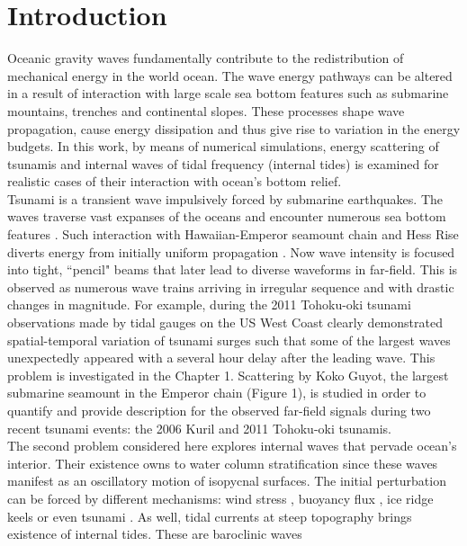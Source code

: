 \documentclass[12pt]{article}
\begin{document}
\newpage
\section{Introduction}
Oceanic gravity waves fundamentally contribute to the redistribution of mechanical energy in the 
world ocean. The wave energy pathways can be altered in a result of interaction with large scale 
sea bottom features such as submarine mountains, trenches and continental slopes. These processes 
shape wave propagation, cause energy dissipation and thus give rise to variation in 
the energy budgets. In this work, by means of numerical simulations, energy scattering of tsunamis 
and internal waves of tidal frequency (internal tides) is examined for realistic cases of their 
interaction with ocean's bottom relief.\\
Tsunami is a transient wave impulsively forced by submarine earthquakes. The waves traverse vast 
expanses of the oceans and encounter numerous sea bottom features \citep{mofjeld2001tsunami}. 
Such interaction with Hawaiian-Emperor seamount chain and Hess Rise diverts energy from initially 
uniform propagation \citep{kowalik2008kuril, tang2012direct}. Now wave intensity is focused 
into tight, ``pencil" beams that later lead to diverse waveforms in far-field. This is observed as 
numerous wave trains arriving in irregular sequence and with drastic changes in magnitude. For 
example, during the 2011 Tohoku-oki tsunami observations made by tidal gauges on the US West Coast 
clearly demonstrated spatial-temporal variation of tsunami surges \citep{Borrero2013} such that 
some of the largest waves unexpectedly appeared with a several hour delay after the leading wave. 
This problem is investigated in the Chapter 1. Scattering by Koko Guyot, the largest submarine 
seamount in the Emperor chain (Figure 1), is studied in order to quantify and provide description 
for the observed far-field signals during two recent tsunami events: the 2006 Kuril and 2011 
Tohoku-oki tsunamis.\\
The second problem considered here explores internal waves that pervade ocean's interior. Their 
existence owns to water column stratification since these waves manifest as an oscillatory motion 
of isopycnal surfaces. The initial perturbation can be forced by different mechanisms: wind 
stress \citep{garrett2001near}, buoyancy flux \citep{garrett1979internal}, ice ridge keels 
\citep{morison1986internal} or even tsunami \citep{santek2007satellite}. As well, tidal 
currents at steep topography brings existence of internal tides. These are baroclinic waves 
\end{document}
